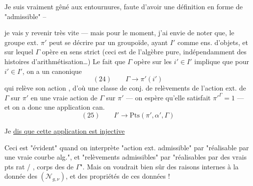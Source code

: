 
 Je suis vraiment gêné
aux entournures, faute d'avoir une
définition en forme de "admissible" --



je vais y revenir très vite --- mais
pour le moment, j'ai envie de noter que,
le groupe ext. $\pi'$ peut se décrire par
un  groupoïde, ayant $I'$ comme ens.
d'objets, et sur lequel $\Gamma$ opère en
sens strict (ceci est de l'algèbre pure,
indépendamment des histoires d'arithmétisation\ldots)
Le fait que $\Gamma$ opère 
sur les $i'\in I'$ implique que pour 
$i'\in I'$, on a un 
 canonique
\[
(24)\qquad \Gamma\longrightarrow\pi'(i')
\]
qui relève son action , d'où
une  classe de conj. de relèvements
de l'action ext. de $\Gamma$ sur $\pi'$
en une vraie action de $\Gamma$ sur $\pi'$
--- on espère qu'elle satisfait ${\pi'}^{\Gamma}=1$ ---
et on a donc une application can.
\[
(25)\qquad I'\longrightarrow\mathrm{Pts}(\pi',\alpha',\Gamma)
\]



Je \uline{dis que cette application est injective}

Ceci est "évident" quand on interprète
"action ext. admissible" par "réalisable
par une vraie courbe alg.", et
"relèvements admissibles" par "réalisables
par des vrais pts rat / , corps des
 de $\Gamma$". Mais on voudrait
bien sûr des raisons internes à
la donnée des $(\mathcal N_{g,\nu})$, et des \unsure{)}
propriétés de ces données ! 


